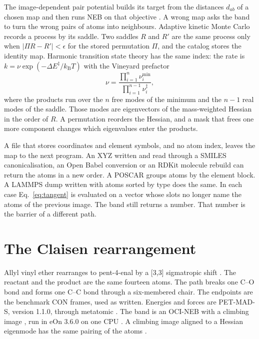 The image-dependent pair potential builds its target from the distances \(d_{ab}\) of a chosen map and then runs NEB on that objective
\cite{smidstrupImprovedInitialGuess2014}.
A wrong map asks the band to turn the wrong pairs of atoms into neighbours.
Adaptive kinetic Monte Carlo records a process by its saddle.
Two saddles \(R\) and \(R'\) are the same process only when \(|\Pi R-R'|<\epsilon\) for the stored permutation \(\Pi\), and the catalog stores the identity map.
Harmonic transition state theory has the same index: the rate is \(k=\nu\exp(-\Delta E^\ddagger/k_{\mathrm{B}}T)\) with the Vineyard prefactor
\cite{vineyardFrequencyFactorsIsotope1957}
\begin{equation}
\label{eq:vineyard}
\nu=\frac{\prod_{i=1}^{n}\nu_i^{\mathrm{min}}}{\prod_{i=1}^{n-1}\nu_i^{\ddagger}},
\end{equation}
where the products run over the \(n\) free modes of the minimum and the \(n-1\) real modes of the saddle.
Those modes are eigenvectors of the mass-weighted Hessian in the order of \(R\).
A permutation reorders the Hessian, and a mask that frees one more component changes which eigenvalues enter the products.

A file that stores coordinates and element symbols, and no atom index, leaves the map to the next program.
An XYZ written and read through a SMILES canonicalisation, an Open Babel conversion or an RDKit molecule rebuild can return the atoms in a new order.
A POSCAR groups atoms by the element block.
A LAMMPS dump written with atoms sorted by type does the same.
In each case Eq.~\eqref{eq:tangent} is evaluated on a vector whose slots no longer name the atoms of the previous image.
The band still returns a number.
That number is the barrier of a different path.

\section{The Claisen rearrangement}\label{sec:claisen}
Allyl vinyl ether rearranges to pent-4-enal by a [3,3] sigmatropic shift
\cite{bakerLocationTransitionStates1996}.
The reactant and the product are the same fourteen atoms.
The path breaks one C--O bond and forms one C--C bond through a six-membered chair.
The endpoints are the benchmark CON frames, used as written.
Energies and forces are PET-MAD-S, version 1.1.0, through metatomic
\cite{mazitovPETMADLightweight2025,bigiMetatensorMetatomicFoundational2026}.
The band is an OCI-NEB with a climbing image
\cite{henkelmanClimbingImageNudged2000}, run in eOn 3.6.0 on one CPU
\cite{rohitgoswamiTheochemuieonV3602026}.
A climbing image aligned to a Hessian eigenmode has the same pairing of the atoms
\cite{goswamiEnhancedClimbingImage2026}.


